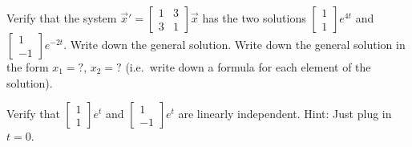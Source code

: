 \documentclass{ximera}
\begin{document}
\begin{exercise}
    
    \begin{tasks}
        \task Verify that the system ${\vec{x}}' =
            \left[ 
                \begin{smallmatrix}
                    1 & 3 \\ 
                    3 & 1
                \end{smallmatrix} 
            \right] 
            \vec{x}$ has the two solutions
            $\left[ 
                \begin{smallmatrix}
                    1 \\ 
                    1
                \end{smallmatrix} 
            \right] e^{4t}$ and
            $\left[ 
                \begin{smallmatrix}
                    1 \\ 
                    -1
                \end{smallmatrix} 
            \right] 
            e^{-2t}$.
        \task Write down the general solution.
        \task Write down the general solution in the form $x_1 = ?$, $x_2 = ?$ (i.e.\ write down a formula for each element of the solution).
    \end{tasks}
\end{exercise}

\begin{exercise}
    Verify that
    $\left[ 
        \begin{smallmatrix}
            1 \\ 
            1
        \end{smallmatrix} 
    \right] 
    e^{t}$ and
    $\left[ 
        \begin{smallmatrix}
            1 \\ 
            -1
        \end{smallmatrix} 
    \right] e^{t}$ 
    are linearly independent.  Hint: Just plug in $t=0$.
\end{exercise}
\end{document}

